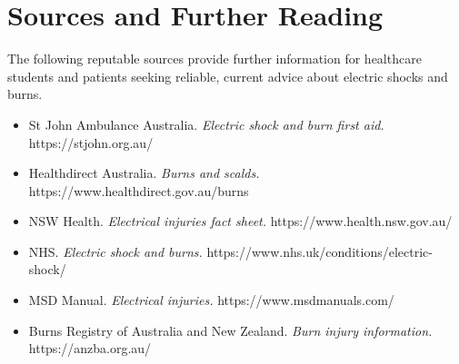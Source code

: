 \section*{Sources and Further Reading}
The following reputable sources provide further information for healthcare students and patients seeking reliable, current advice about electric shocks and burns.
\begin{itemize}
    \item St John Ambulance Australia. \textit{Electric shock and burn first aid.} https://stjohn.org.au/
    \item Healthdirect Australia. \textit{Burns and scalds.} https://www.healthdirect.gov.au/burns
    \item NSW Health. \textit{Electrical injuries fact sheet.} https://www.health.nsw.gov.au/
    \item NHS. \textit{Electric shock and burns.} https://www.nhs.uk/conditions/electric-shock/
    \item MSD Manual. \textit{Electrical injuries.} https://www.msdmanuals.com/
    \item Burns Registry of Australia and New Zealand. \textit{Burn injury information.} https://anzba.org.au/
\end{itemize}
